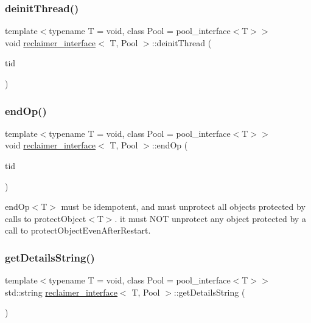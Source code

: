 \subsubsection{\texorpdfstring{deinit\+Thread()}{deinitThread()}}
{\footnotesize\ttfamily template$<$typename T  = void, class Pool  = pool\+\_\+interface$<$\+T$>$$>$ \\
void \hyperlink{classreclaimer__interface}{reclaimer\+\_\+interface}$<$ T, Pool $>$\+::deinit\+Thread (\begin{DoxyParamCaption}\item[{const int}]{tid }\end{DoxyParamCaption})\hspace{0.3cm}{\ttfamily [inline]}}

\mbox{\label{classreclaimer__interface_a913e054b17192c9c905469a19eb7dbd4}} 
\subsubsection{\texorpdfstring{end\+Op()}{endOp()}}
{\footnotesize\ttfamily template$<$typename T  = void, class Pool  = pool\+\_\+interface$<$\+T$>$$>$ \\
void \hyperlink{classreclaimer__interface}{reclaimer\+\_\+interface}$<$ T, Pool $>$\+::end\+Op (\begin{DoxyParamCaption}\item[{const int}]{tid }\end{DoxyParamCaption})\hspace{0.3cm}{\ttfamily [inline]}}

end\+Op$<$\+T$>$ must be idempotent, and must unprotect all objects protected by calls to protect\+Object$<$\+T$>$. it must N\+OT unprotect any object protected by a call to protect\+Object\+Even\+After\+Restart. \mbox{\label{classreclaimer__interface_ada48535c0c82904eb0bbe3491e52eca7}} 
\subsubsection{\texorpdfstring{get\+Details\+String()}{getDetailsString()}}
{\footnotesize\ttfamily template$<$typename T  = void, class Pool  = pool\+\_\+interface$<$\+T$>$$>$ \\
std\+::string \hyperlink{classreclaimer__interface}{reclaimer\+\_\+interface}$<$ T, Pool $>$\+::get\+Details\+String (\begin{DoxyParamCaption}{ }\end{DoxyParamCaption})\hspace{0.3cm}{\ttfamily [inline]}}

